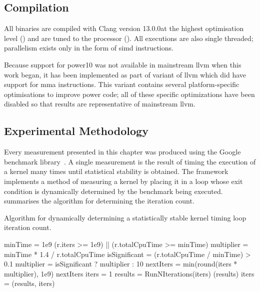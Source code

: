\documentclass[\main/thesis.tex]{subfiles}
\begin{document}
\subsection{Compilation}
All binaries are compiled with Clang version 13.0.0\footnotemark at the highest optimisation level () and are tuned to the processor ().
All executions are also single threaded; parallelism exists only in the form of \gls{simd} instructions.

Because support for \gls{power10} was not available in mainstream \gls{llvm} when this work began, it has been implemented as part of  variant of \gls{llvm} which did have support for \gls{mma} instructions.
This variant contains several platform-specific optimisations to improve \gls{power} code; all of these specific optimizations have been disabled so that results are representative of mainstream \gls{llvm}.

\subsection{Experimental Methodology}
Every measurement presented in this chapter was produced using the Google\texttrademark{} benchmark library\footnotemark~\autocite{googlebench}.
A single measurement is the result of timing the execution of a kernel many times until statistical stability is obtained.
The framework implements a method of measuring a kernel by placing it in a loop whose exit condition is dynamically determined by the benchmark being executed.
 summarises the algorithm for determining the iteration count.

\begin{algorithm}[t]
  \caption[Algorithm for Creating a Cycle Measurement]{Algorithm for dynamically determining a statistically stable kernel timing loop iteration count.}
  \label{alg:benchmark}
  \begin{algorithmic}[1]
    \State minTime = 1e9 
      \State \Return (r.iters >= 1e9) || (r.totalCpuTime >= minTime)
    \EndFunction
      \State multiplier = minTime * 1.4 / r.totalCpuTime
      \State isSignificant = (r.totalCpuTime / minTime) > 0.1
      \State multiplier = isSignificant ? multiplier : 10
      \State nextIters = min(round(iters * multiplier), 1e9)
      \State \Return nextIters
    \EndFunction
      \State iters = 1
        \State results = RunNIterations(iters)
          \State {}(results)
          \State \Return
        \EndIf
        \State iters = (results, iters)
      \EndWhile
    \EndFunction
  \end{algorithmic}
\end{algorithm}
\end{document}
